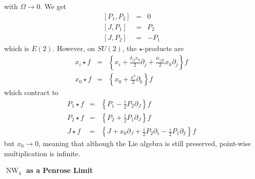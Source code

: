 \documentclass[14pt, a4paper, titlepage]{slides}
\DeclareMathOperator{\NW}{NW}
\newcommand{\cb}[2]{\left[ {#1} , {#2} \right]}
\begin{document}
with $\Omega\rightarrow 0$. We get
\begin{eqnarray*}
  \cb{P_1}{P_2}&=&0\\
  \cb{J}{P_1}&=&P_2\\
  \cb{J}{P_2}&=&-P_1
\end{eqnarray*}
which is $E(2)$. However, on $SU(2)$, the $\star$-products are
\begin{eqnarray*}
  x_i\star f&=&\left\{x_i +\frac{\delta_{ij}x_0}{2}\partial_j +
    \frac{i\epsilon_{ijk}}{2}x_k\partial_j\right\}f\\
  x_0\star f&=& \left\{x_0 + \frac{x^k}{2}\partial_k\right\}f
\end{eqnarray*}
which contract to
\begin{eqnarray*}
  P_1\star f&=& \left\{ P_1 -\frac{i}{2}P_2\partial_J\right\}f\\
  P_2\star f&=& \left\{ P_2 +\frac{i}{2}P_1\partial_J\right\}f\\
  J\star f &=&  \left\{ J + x_0\partial_J+\frac{i}{2}P_2\partial_1-\frac{i}{2}P_1\partial_2\right\}f
\end{eqnarray*}
but $x_0\rightarrow 0$, meaning that although the Lie algebra is still
preserved, point-wise multiplication is infinite.

\textbf{$\NW_4$ as a Penrose Limit}
\end{document}
